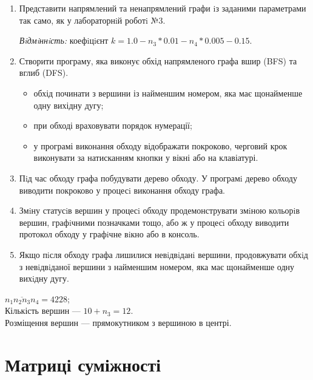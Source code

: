 
\def\basedir{/home/theammir/labs/asd/lab2.5/res}


\usepackage{graphicx}
\usepackage[hypcap=false]{caption}
\usepackage{framed}


\def\thelabid{lab2.5}

\taskdesc%
\begin{enumerate}
  \item Представити напрямлений та ненапрямлений графи iз заданими параметрами так само, як у лабораторнiй роботi №3.\par
    \emph{Вiдмiннiсть:} коефiцiєнт $k = 1.0 - n_3 * 0.01 - n_4 * 0.005 - 0.15$.
  \item Створити програму, яка виконує обхід напрямленого графа вшир (BFS) та вглиб (DFS).
    \begin{itemize}
      \item обхід починати з вершини із найменшим номером, яка має щонайменше одну вихідну дугу;
      \item при обході враховувати порядок нумерації;
      \item у програмі виконання обходу відображати покроково, черговий крок виконувати за натисканням кнопки у вікні або на клавіатурі.
    \end{itemize}
  \item Пiд час обходу графа побудувати дерево обходу. У програмi дерево обходу виводити покроково у процесi виконання обходу графа.
  \item Змiну статусiв вершин у процесi обходу продемонструвати змiною кольорiв вершин, графiчними позначками тощо,
    або ж у процесi обходу виводити протокол обходу у графiчне вiкно або в консоль.
  \item Якщо пiсля обходу графа лишилися невiдвiданi вершини, продовжувати обхiд з невiдвiданої вершини з найменшим номером,
    яка має щонайменше одну вихiдну дугу.
\end{enumerate}

\taskspec%
$\overline{n_1 n_2 n_3 n_4} = 4228$;\\
Кількість вершин --- $10 + n_3 = 12$.\\
Розміщення вершин --- прямокутником з вершиною в центрі.


\section{Матриці суміжності}

